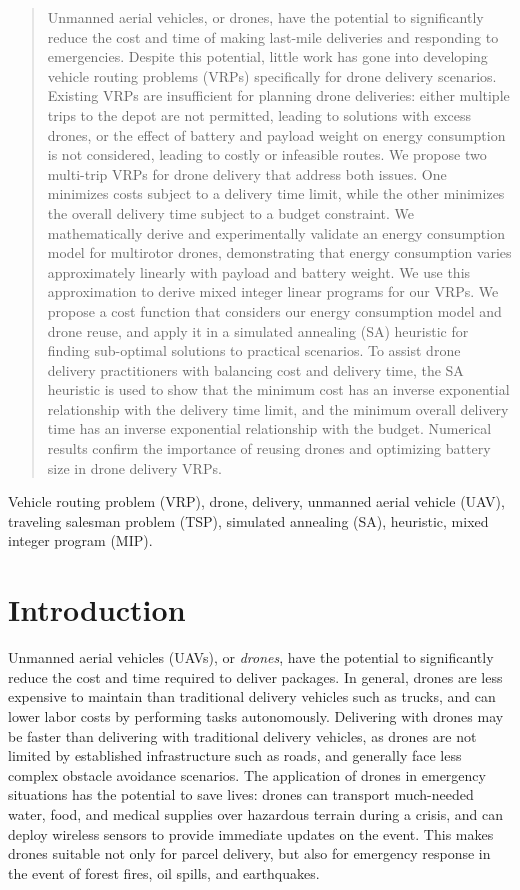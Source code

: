 \documentclass[journal]{IEEEtran}
\begin{document}
\begin{abstract}
Unmanned aerial vehicles, or drones, have the potential to significantly reduce the cost and time of making last-mile deliveries and responding to emergencies. Despite this potential, little work has gone into developing vehicle routing problems (VRPs) specifically for drone delivery scenarios. Existing VRPs are insufficient for planning drone deliveries: either multiple trips to the depot are not permitted, leading to solutions with excess drones, or the effect of battery and payload weight on energy consumption is not considered, leading to costly or infeasible routes. We propose two multi-trip VRPs for drone delivery that address both issues. One minimizes costs subject to a delivery time limit, while the other minimizes the overall delivery time subject to a budget constraint. We mathematically derive and experimentally validate an energy consumption model for multirotor drones, demonstrating that energy consumption varies approximately linearly with payload and battery weight. We use this approximation to derive mixed integer linear programs for our VRPs. We propose a cost function that considers our energy consumption model and drone reuse, and apply it in a simulated annealing (SA) heuristic for finding sub-optimal solutions to practical scenarios. To assist drone delivery practitioners with balancing cost and delivery time, the SA heuristic is used to show that the minimum cost has an inverse exponential relationship with the delivery time limit, and the minimum overall delivery time has an inverse exponential relationship with the budget. Numerical results confirm the importance of reusing drones and optimizing battery size in drone delivery VRPs.
\end{abstract}

\begin{IEEEkeywords}
Vehicle routing problem (VRP), drone, delivery, unmanned aerial vehicle (UAV), traveling salesman problem (TSP), simulated annealing (SA), heuristic, mixed integer program (MIP).
\end{IEEEkeywords}

\section{Introduction}

Unmanned aerial vehicles (UAVs), or \emph{drones}, have the potential to significantly reduce the cost and time required to deliver packages. In general, drones are less expensive to maintain than traditional delivery vehicles such as trucks, and can lower labor costs by performing tasks autonomously. Delivering with drones may be faster than delivering with traditional delivery vehicles, as drones are not limited by established infrastructure such as roads, and generally face less complex obstacle avoidance scenarios. The application of drones in emergency situations has the potential to save lives: drones can transport much-needed water, food, and medical supplies over hazardous terrain during a crisis, and can deploy wireless sensors to provide immediate updates on the event. This makes drones suitable not only for parcel delivery, but also for emergency response in the event of forest fires, oil spills, and earthquakes.
\end{document}
